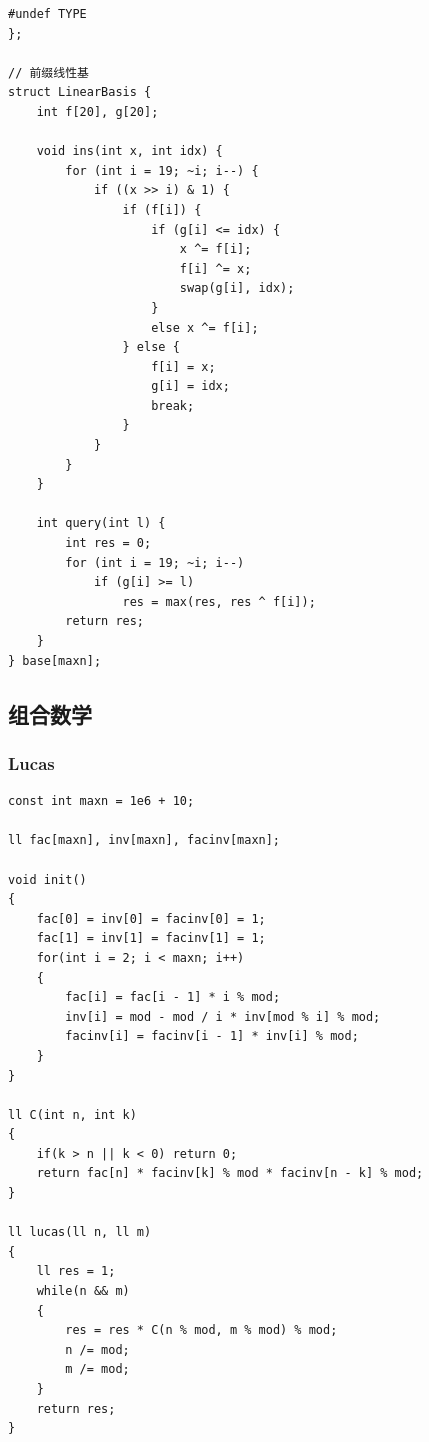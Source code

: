 \documentclass[twoside]{article}
\begin{document}
\begin{lstlisting}
#undef TYPE
};

// 前缀线性基
struct LinearBasis {
    int f[20], g[20];

    void ins(int x, int idx) {
        for (int i = 19; ~i; i--) {
            if ((x >> i) & 1) {
                if (f[i]) {
                    if (g[i] <= idx) {
                        x ^= f[i];
                        f[i] ^= x;
                        swap(g[i], idx);
                    }
                    else x ^= f[i];
                } else {
                    f[i] = x;
                    g[i] = idx;
                    break;
                }
            }
        }
    }

    int query(int l) {
        int res = 0;
        for (int i = 19; ~i; i--)
            if (g[i] >= l)
                res = max(res, res ^ f[i]);
        return res;
    }
} base[maxn];\end{lstlisting}
\subsection{组合数学}
\subsubsection{Lucas}
\begin{lstlisting}
const int maxn = 1e6 + 10;

ll fac[maxn], inv[maxn], facinv[maxn];

void init()
{
    fac[0] = inv[0] = facinv[0] = 1;
    fac[1] = inv[1] = facinv[1] = 1;
    for(int i = 2; i < maxn; i++)
    {
        fac[i] = fac[i - 1] * i % mod;
        inv[i] = mod - mod / i * inv[mod % i] % mod;
        facinv[i] = facinv[i - 1] * inv[i] % mod;
    }
}

ll C(int n, int k)
{
    if(k > n || k < 0) return 0;
    return fac[n] * facinv[k] % mod * facinv[n - k] % mod;
}

ll lucas(ll n, ll m)
{
    ll res = 1;
    while(n && m)
    {
        res = res * C(n % mod, m % mod) % mod;
        n /= mod;
        m /= mod;
    }
    return res;
}\end{lstlisting}
\end{document}

